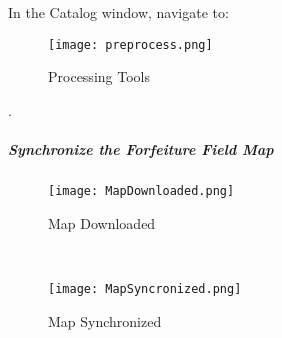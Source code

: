 \noindent In the Catalog window, navigate to:

\noindent \textcolor{HyperlinkBlue1}{\scriptsize{}}
 \begin{wrapfigure}{r}{0.5\textwidth}
 \centering
     \texttt{[image: preprocess.png]}
 \vspace{-.1in}

 \caption{Processing Tools}
 \end{wrapfigure}
 .
 \vspace{2in}

 \vspace{.5in}



 \clearpage


 \subparagraph{Synchronize the Forfeiture Field Map}

 \begin{wrapfigure}{r}{0.5\textwidth}
 \centering
     \texttt{[image: MapDownloaded.png]}
 \caption{Map Downloaded}
 \vspace{.25in}

 \HRule \\[.4cm] %
 \vspace{.25in}

     \texttt{[image: MapSyncronized.png]}
 \caption{Map Synchronized}
 \end{wrapfigure}
 \vspace{1in}

 \vspace{3in}

 \vspace{1in}

 \clearpage

